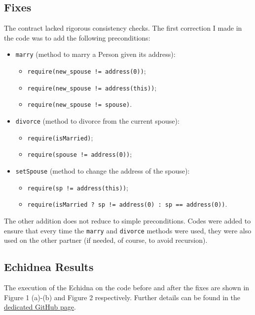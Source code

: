 \documentclass[a4paper,10pt]{article}
\begin{document}
\subsection{Fixes}

The contract lacked rigorous consistency checks. The first correction I made in the code was to add the following preconditions:
\begin{itemize}
    \item \texttt{marry} (method to marry a Person given its address):
    \begin{itemize}
        \item \texttt{require(new\_spouse != address(0))};
        \item \texttt{require(new\_spouse != address(this))};
        \item \texttt{require(new\_spouse != spouse)}.
    \end{itemize}
    \item \texttt{divorce} (method to divorce from the current spouse):
    \begin{itemize}
        \item \texttt{require(isMarried)};
        \item \texttt{require(spouse != address(0))};
    \end{itemize}
    \item \texttt{setSpouse} (method to change the address of the spouse):
    \begin{itemize}
        \item \texttt{require(sp != address(this))};
        \item \texttt{require(isMarried ? sp != address(0) : sp == address(0))}.
    \end{itemize}
\end{itemize}

The other addition does not reduce to simple preconditions. Codes were added to ensure that every time the \texttt{marry} and \texttt{divorce} methods were used, they were also used on the other partner (if needed, of course, to avoid recursion).

\subsection{Echidnea Results}

The execution of the Echidna on the code before and after the fixes are shown in Figure 1 (a)-(b) and Figure 2 respectively. Further details can be found in the \href{https://github.com/AntoninoRando/SoftwareSecurity}{dedicated GitHub page}.
\end{document}
